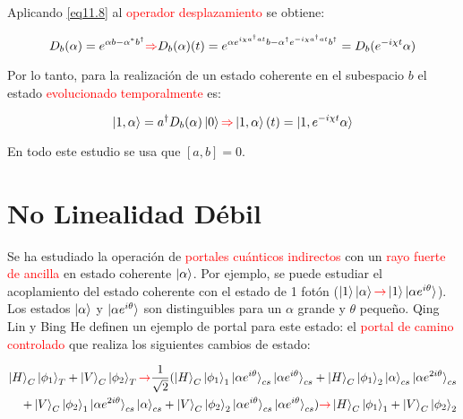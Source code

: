 \documentclass{book}
\begin{document}
Aplicando \ref{eq11.8} al \textcolor{red}{operador desplazamiento} se obtiene:

\begin{equation}\label{eq11.9}D_b(\alpha)=e^{\alpha b-\alpha^* b^\dag}\textcolor{red}{\Rightarrow} D_b(\alpha)(t)=e^{\alpha e^{i\chi a^\dag a t}b-\alpha^\dag e^{-i\chi a^\dag a t}b^\dag}=D_b(e^{-i\chi t}\alpha)\end{equation}

Por lo tanto, para la realización de un estado coherente en el subespacio $b$ el estado \textcolor{red}{evolucionado temporalmente} es:

\begin{equation}\label{eq11.10}\ket{1,\alpha}=a^\dag D_b(\alpha)\ket{0}\textcolor{red}{\Rightarrow} \ket{1,\alpha}(t)=\ket{1,e^{-i\chi t}\alpha}\end{equation}

En todo este estudio se usa que $[a,b]=0$.
\section{No Linealidad Débil}

Se ha estudiado la operación de \textcolor{red}{portales cuánticos indirectos} con un \textcolor{red}{rayo fuerte de ancilla} en estado coherente $\ket{\alpha}$. Por ejemplo, se puede estudiar el acoplamiento del estado coherente con el estado de 1 fotón ($\ket{1}\ket{\alpha}\textcolor{red}{\rightarrow}\ket{1}\ket{\alpha e^{i\theta}}$). Los estados $\ket{\alpha}$ y $\ket{\alpha e^{i\theta}}$ son distinguibles para un $\alpha$ grande y $\theta$ pequeño. Qing Lin y Bing He definen un ejemplo de portal para este estado: el \textcolor{red}{portal de camino controlado} que realiza los siguientes cambios de estado:

\begin{equation}\label{eq11.11}\begin{aligned}\ket{H}_C\ket{\phi_1}_T+\ket{V}_C\ket{\phi_2}_T\textcolor{red}{\rightarrow}\frac{1}{\sqrt{2}}(\ket{H}_C\ket{\phi_1}_1\ket{\alpha e^{i\theta}}_{cs}\ket{\alpha e^{i\theta}}_{cs}+\ket{H}_C\ket{\phi_1}_2\ket{\alpha}_{cs}\ket{\alpha e^{2i\theta}}_{cs}\\ +\ket{V}_C\ket{\phi_2}_1\ket{\alpha e^{2i\theta}}_{cs}\ket{\alpha}_{cs}+\ket{V}_C\ket{\phi_2}_2\ket{\alpha e^{i\theta}}_{cs}\ket{\alpha e^{i\theta}}_{cs})\textcolor{red}{\rightarrow} \ket{H}_C\ket{\phi_1}_1+\ket{V}_C\ket{\phi_2}_2\end{aligned}\end{equation}
\end{document}
